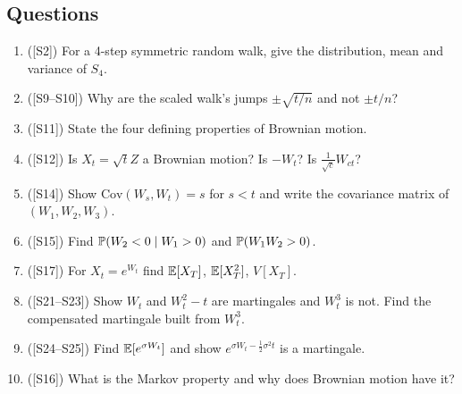 \documentclass[10pt]{article}
\begin{document}
\subsection*{Questions}
\begin{enumerate}[label=Q\arabic*.]
\item ([S2]) For a 4-step symmetric random walk, give the distribution, mean and variance of $S_4$.
\item ([S9--S10]) Why are the scaled walk's jumps $\pm\sqrt{t/n}$ and not $\pm t/n$?
\item ([S11]) State the four defining properties of Brownian motion.
\item ([S12]) Is $X_t=\sqrt tZ$ a Brownian motion? Is $-W_t$? Is $\frac1{\sqrt c}W_{ct}$?
\item ([S14]) Show $\mathrm{Cov}(W_s,W_t)=s$ for $s<t$ and write the covariance matrix of $(W_1,W_2,W_3)$.
\item ([S15]) Find $\mathbb{P}(W_2<0\mid W_1>0)$ and $\mathbb{P}(W_1W_2>0)$.
\item ([S17]) For $X_t=e^{W_t}$ find $\mathbb{E}[X_T]$, $\mathbb{E}[X_T^2]$, $V[X_T]$.
\item ([S21--S23]) Show $W_t$ and $W_t^2-t$ are martingales and $W_t^3$ is not. Find the compensated martingale built from $W_t^3$.
\item ([S24--S25]) Find $\mathbb{E}[e^{\sigma W_t}]$ and show $e^{\sigma W_t-\frac12\sigma^2t}$ is a martingale.
\item ([S16]) What is the Markov property and why does Brownian motion have it?
\end{enumerate}
\end{document}

